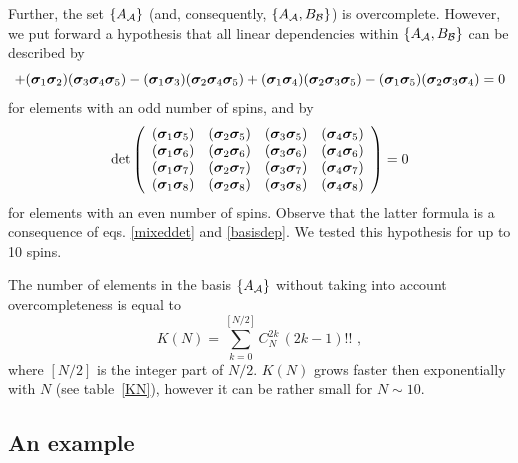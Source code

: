 \documentclass[a4paper]{jpconf}
\renewcommand\[{\begin{equation}}
\renewcommand\]{\end{equation}}
\newcommand{\ssigma}{{\bm \sigma}}
\newcommand{\A}{{\cal A}}
\newcommand{\B}{{\cal B}}
\begin{document}
Further, the set  $\{A_\A\}$ (and, consequently, $\{A_\A,B_\B\}$) is overcomplete. However, we put forward a hypothesis that  all linear dependencies within  $\{A_\A,B_\B\}$ can be described by
\[{\rm{ + (}}{{\ssigma}_1}{{\ssigma}_2}{\rm{)(}}{{\ssigma}_3}{{\ssigma}_4}{{\ssigma}_5}{\rm{) - (}}{{\ssigma}_1}{{\ssigma}_3}{\rm{)(}}{{\ssigma}_2}{{\ssigma}_4}{{\ssigma}_5}{\rm{)}} + {\rm{(}}{{\ssigma}_1}{{\ssigma}_4}{\rm{)(}}{{\ssigma}_2}{{\ssigma}_3}{{\ssigma}_5}{\rm{) - (}}{{\ssigma}_1}{{\ssigma}_5}{\rm{)(}}{{\ssigma}_2}{{\ssigma}_3}{{\ssigma}_4}{\rm{)}} = 0
\label{basisdep}
\]
for elements with an odd number of spins, and by
\[\det \left( {\begin{array}{*{20}{c}}
	{{\rm{(}}{{\ssigma}_1}{{\ssigma}_5}{\rm{)}}}&{{\rm{(}}{{\ssigma}_2}{{\ssigma}_5}{\rm{)}}}&{{\rm{(}}{{\ssigma}_3}{{\ssigma}_5}{\rm{)}}}&{{\rm{(}}{{\ssigma}_4}{{\ssigma}_5}{\rm{)}}}\\
	{{\rm{(}}{{\ssigma}_1}{{\ssigma}_6}{\rm{)}}}&{{\rm{(}}{{\ssigma}_2}{{\ssigma}_6}{\rm{)}}}&{{\rm{(}}{{\ssigma}_3}{{\ssigma}_6}{\rm{)}}}&{{\rm{(}}{{\ssigma}_4}{{\ssigma}_6}{\rm{)}}}\\
	{{\rm{(}}{{\ssigma}_1}{{\ssigma}_7}{\rm{)}}}&{{\rm{(}}{{\ssigma}_2}{{\ssigma}_7}{\rm{)}}}&{{\rm{(}}{{\ssigma}_3}{{\ssigma}_7}{\rm{)}}}&{{\rm{(}}{{\ssigma}_4}{{\ssigma}_7}{\rm{)}}}\\
	{{\rm{(}}{{\ssigma}_1}{{\ssigma}_8}{\rm{)}}}&{{\rm{(}}{{\ssigma}_2}{{\ssigma}_8}{\rm{)}}}&{{\rm{(}}{{\ssigma}_3}{{\ssigma}_8}{\rm{)}}}&{{\rm{(}}{{\ssigma}_4}{{\ssigma}_8}{\rm{)}}}
	\end{array}} \right) = 0\]
for elements with an even number of spins. Observe that the latter formula is a consequence of eqs. \eqref{mixeddet} and \eqref{basisdep}.
We tested this hypothesis for up to 10 spins.

The number of elements in the basis $\{A_\A\}$ without taking into account overcompleteness is equal to
\[K(N)=\sum_{k=0}^{[N/2]}C_N^{2k}\,(2k-1)!!\,\,,\]
where $[N/2]$ is the integer part of $N/2$.
$K(N)$ grows faster then exponentially with $N$ (see table~\ref{KN}), however it can be rather small for $N\sim 10$.



\subsection{An example}
\end{document}
